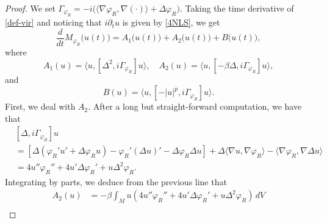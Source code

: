 \documentclass[10pt,leqno]{amsart}
\numberwithin{equation}{section}
\begin{document}
\begin{proof}
We set $\Gamma_{\varphi_R}=-i \big(\langle\nabla \varphi_R, \nabla (\cdot)\rangle +\Delta \varphi_R\big)$. Taking the time derivative of \eqref{def-vir} and noticing that $i\partial_t u$ is given by \eqref{4NLS}, we get
$$\dfrac{d}{dt}M_{\varphi_R} \big(u(t)\big)=A_1\big(u(t)\big) +A_2\big(u(t)\big) +B\big(u(t)\big),$$
where
\[
A_1(u) = \big\langle u, [\Delta^2 , i\Gamma_{\varphi_R}] u\big\rangle,\quad
A_2 (u) = \big\langle u, [-\beta\Delta , i\Gamma_{\varphi_R}] u\big\rangle,
\]
and
\[
B(u) =  \big\langle u, [-|u|^p , i\Gamma_{\varphi_R}] u\big\rangle.
\]
First, we deal with $A_2$. After a long but straight-forward computation, we have that
\begin{align*}
& [\Delta , i\Gamma_{\varphi_R}] u\\
&=[\Delta  (\varphi_R ' u' +\Delta \varphi_R u) -\varphi_R ' (\Delta u)' - \Delta \varphi_R \Delta u]+\Delta \langle\nabla u, \nabla \varphi_R\rangle - \langle\nabla \varphi_R,\nabla \Delta u\rangle \\
&= 4 u'' \varphi_R '' + 4u' \Delta \varphi_R ' + u \Delta^2 \varphi_R.
\end{align*}
Integrating by parts, we deduce from the previous line that
\begin{align*}
A_2 (u)&=
-\beta \int_{M} u (4 u'' \varphi_R '' +4u' \Delta \varphi_R '  + u\Delta^2 \varphi_R)\, dV\\

\end{align*}
\end{proof}
\end{document}
